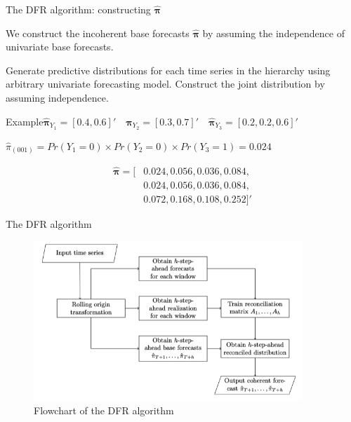 \documentclass[12pt]{beamer}
\begin{document}
\begin{frame}{The DFR algorithm: constructing $\hat{\boldsymbol{\pi}}$ }

    We construct the incoherent base forecasts $\hat{\boldsymbol{\pi}}$ by assuming the independence of univariate base forecasts.

    \begin{outline}[enumerate]
        \1 Generate predictive distributions for each time series in the hierarchy using arbitrary univariate forecasting model.
        \1 Construct the joint distribution by assuming independence.
    \end{outline}

    \begin{block}{Example}$\hat{\boldsymbol{\pi}}_{Y_1} = [0.4, 0.6]'\quad \hat{\boldsymbol{\pi}}_{Y_2} = [0.3, 0.7]' \quad \hat{\boldsymbol{\pi}}_{Y_3} = [0.2, 0.2, 0.6]'$

        $
          \hat{\pi}_{(001)} = Pr(Y_1=0) \times Pr(Y_2=0) \times Pr(Y_3=1) =  0.024
        $

        \[\begin{aligned}
          \hat{\boldsymbol{\pi}} = [&0.024,0.056,0.036,0.084, \\ &0.024,0.056,0.036,0.084, \\ &0.072,0.168,0.108,0.252]'
        \end{aligned}\]
    \end{block}
\end{frame}


\begin{frame}{The DFR algorithm}
\begin{figure}
    \includegraphics[width=0.9\textwidth]{figures/dfr.png}
    \caption{Flowchart of the DFR algorithm}        
\end{figure}
\end{frame}
\end{document}
